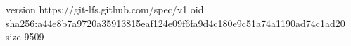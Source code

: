 version https://git-lfs.github.com/spec/v1
oid sha256:a44e8b7a9720a35913815eaf124e09f6fa9d4c180e9c51a74a1190ad74c1ad20
size 9509
